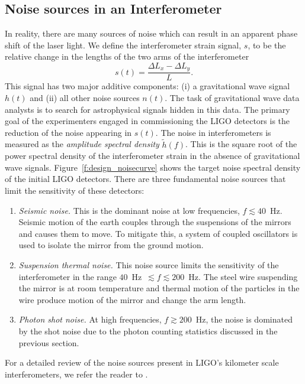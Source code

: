 \subsection{Noise sources in an Interferometer}
\label{ss:noise}

In reality, there are many sources of noise which can result in an apparent
phase shift of the laser light.  We define the interferometer strain signal,
$s$, to be the relative change in the lengths of the two arms of the
interferometer
\begin{equation}
s(t) = \frac{\Delta L_x - \Delta L_y}{L}.
\end{equation}
This signal has two major additive components: (i) a gravitational wave signal
$h(t)$ and (ii) all other noise sources $n(t)$.  The task of gravitational
wave data analysts is to search for astrophysical signals hidden in this data.
The primary goal of the experimenters engaged in commissioning the LIGO
detectors is the reduction of the noise appearing in $s(t)$.  The noise in
interferometers is measured as the \emph{amplitude spectral density}
$\tilde{h}(f)$. This is the square root of the power spectral density of the
interferometer strain in the absence of gravitational wave signals.
Figure~\ref{f:design_noisecurve} shows the target noise spectral density of
the initial LIGO detectors. There are three fundamental noise sources that
limit the sensitivity of these detectors: 
\begin{enumerate}
\item \emph{Seismic noise.} This is the dominant noise at low frequencies, $f
\lesssim 40$~Hz.  Seismic motion of the earth couples through the suspensions
of the mirrors and causes them to move. To mitigate this, a system of coupled
oscillators is used to isolate the mirror from the ground motion. 

\item \emph{Suspension thermal noise.} This noise source limits the
sensitivity of the interferometer in the range $40$~Hz~$\lesssim f \lesssim
200$~Hz. The steel wire suspending the mirror is at room temperature and
thermal motion of the particles in the wire produce motion of the mirror and
change the arm length.

\item \emph{Photon shot noise.} At high frequencies, $f \gtrsim 200$~Hz, the
noise is dominated by the shot noise due to the photon counting statistics
discussed in the previous section.
\end{enumerate}
For a detailed review of the noise sources present in LIGO's kilometer scale
interferometers, we refer the reader to \cite{Adhikari:thesis}. 

